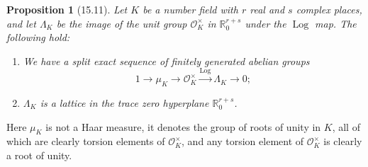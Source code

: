 \documentclass[UTF8,11pt]{ctexart}
\newtheorem*{proposition}{Proposition}
\begin{document}
\begin{proposition}[15.11]
Let $K$ be a number field with $r$ real and $s$ complex places, and let $\Lambda_K$ be the image of the unit group $\mathcal O_K^\times$ in $\mathbb R^{r+s}_0$ under the $\operatorname{Log}$ map. The following hold:
\begin{enumerate}
\item We have a split exact sequence of finitely generated abelian groups
\[
1\longrightarrow\mu_K\longrightarrow\mathcal O_K^\times
\xrightarrow{\operatorname{Log}}\Lambda_K\longrightarrow0;
\]
\item $\Lambda_K$ is a lattice in the trace zero hyperplane $\mathbb R^{r+s}_0$.
\end{enumerate}
\end{proposition}
Here $\mu_K$ is not a Haar measure, it denotes the group of roots of unity in $K$, all of which are clearly torsion elements of $\mathcal O_K^\times$, and any torsion element of $\mathcal O_K^\times$ is clearly a root of unity.
\end{document}

